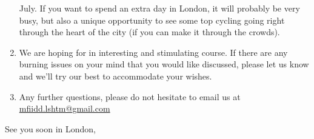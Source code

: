 \documentclass[paper=a4, 11pt]{scrlttr2}
\begin{document}
\begin{letter}{}
\begin{enumerate}
July. If you want to spend an extra day in London, it will probably be
very busy, but also a unique opportunity to see some top cycling going
right through the heart of the city (if you can make it through the
crowds).
\item We are hoping for in interesting and stimulating course. If there are
any burning issues on your mind that you would like discussed, please
let us know and we'll try our best to accommodate your wishes.
\item Any further questions, please do not hesitate to email us at
\href{mailto:mfiidd.lshtm@gmail.com}{mfiidd.lshtm@gmail.com}
\end{enumerate}

\closing{See you soon in London,}
\end{letter}
\end{document}
